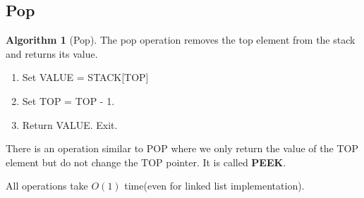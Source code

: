 \documentclass[10pt, a4paper]{extarticle}
\theoremstyle{definition}
\newtheorem{alg}{Algorithm}
\begin{document}
	\subsection{Pop}
	\begin{alg}[Pop]
		The pop operation removes the top element from the stack and returns its value.
		\begin{enumerate}
			\item Set VALUE = STACK[TOP]
			\item Set TOP = TOP - 1.
			\item Return VALUE. Exit.
	\end{enumerate}
	There is an operation similar to POP where we only return the value of the TOP element but do not change the TOP pointer. It is called \textbf{PEEK}.
	\end{alg}

	All operations take $O(1)$ time(even for linked list implementation).
\end{document}

